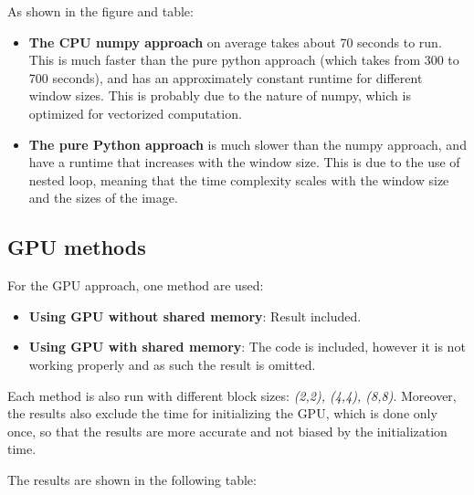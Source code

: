 \documentclass[
  10pt,
  a4paper,
  a4paper]{article}
\providecommand{\tightlist}{%
  \setlength{\itemsep}{0pt}\setlength{\parskip}{0pt}}\usepackage{longtable,booktabs,array}
\begin{document}
As shown in the figure and table:

\begin{itemize}
\item
  \textbf{The CPU numpy approach} on average takes about 70 seconds to
  run. This is much faster than the pure python approach (which takes
  from 300 to 700 seconds), and has an approximately constant runtime
  for different window sizes. This is probably due to the nature of
  numpy, which is optimized for vectorized computation.
\item
  \textbf{The pure Python approach} is much slower than the numpy
  approach, and have a runtime that increases with the window size. This
  is due to the use of nested loop, meaning that the time complexity
  scales with the window size and the sizes of the image.
\end{itemize}

\hypertarget{gpu-methods}{%
\subsection{GPU methods}\label{gpu-methods}}

For the GPU approach, one method are used:

\begin{itemize}
\tightlist
\item
  \textbf{Using GPU without shared memory}: Result included.
\item
  \textbf{Using GPU with shared memory}: The code is included, however
  it is not working properly and as such the result is omitted.
\end{itemize}

Each method is also run with different block sizes: \emph{(2,2), (4,4),
(8,8)}. Moreover, the results also exclude the time for initializing the
GPU, which is done only once, so that the results are more accurate and
not biased by the initialization time.

The results are shown in the following table:
\end{document}
